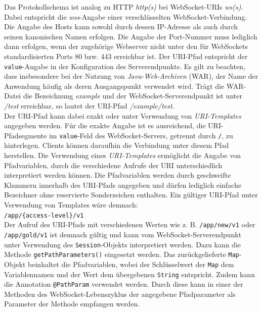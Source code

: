 \documentclass[11pt,a4paper,titlepage]{scrartcl}
\numberwithin{equation}{section}
\begin{document}
\noindent Das Protokollschema ist analog zu HTTP \textit{http(s)} bei WebSocket-URIs \textit{ws(s)}. Dabei entspricht die \textit{wss}-Angabe einer verschlüsselten WebSocket-Verbindung. Die Angabe des Hosts kann sowohl durch dessen IP-Adresse als auch durch seinen kanonischen Namen erfolgen. Die Angabe der Port-Nummer muss lediglich dann erfolgen, wenn der zugehörige Webserver nicht unter den für WebSockets standardisierten Ports 80 bzw. 443 erreichbar ist. Der URI-Pfad entspricht der \texttt{value}-Angabe in der Konfiguration des Serverendpunkts. Es gilt zu beachten, dass insbesondere bei der Nutzung von \textit{Java-Web-Archiven} (WAR), der Name der Anwendung häufig als deren Ausgangspunkt verwendet wird. Trägt die WAR-Datei die Bezeichnung \textit{example} und der WebSocket-Serverendpunkt ist unter \textit{/test} erreichbar, so lautet der URI-Pfad \textit{/example/test}. \\
\noindent Der URI-Pfad kann dabei exakt oder unter Verwendung von \textit{URI-Templates} angegeben werden. Für die exakte Angabe ist es ausreichend, die URI-Pfadsegmente im \texttt{value}-Feld des WebSocket-Servers, getrennt durch \texttt{/}, zu hinterlegen. Clients können daraufhin die Verbindung unter diesem Pfad herstellen. Die Verwendung eines \textit{URI-Templates} ermöglicht die Angabe von Pfadvariablen, durch die verschiedene Aufrufe der URI unterschiedlich interpretiert werden können. Die Pfadvariablen werden durch geschweifte Klammern innerhalb des URI-Pfads angegeben und dürfen lediglich einfache Bezeichner ohne reservierte Sonderzeichen enthalten. Ein gültiger URI-Pfad unter Verwendung von Templates wäre demnach: \\

\noindent\texttt{/app/\{access-level\}/v1}\\

\noindent Der Aufruf des URI-Pfads mit verschiedenen Werten wie z. B. \texttt{/app/new/v1} oder \texttt{/app/gold/v1} ist demnach gültig und kann vom WebSocket-Serverendpunkt unter Verwendung des \texttt{Session}-Objekts interpretiert werden. Dazu kann die Methode \texttt{getPathParameters()} eingesetzt werden. Das zurückgelieferte \texttt{Map}-Objekt beinhaltet die Pfadvariablen, wobei der Schlüsselwert der \texttt{Map} dem Variablennamen und der Wert dem übergebenen \texttt{String} entspricht. Zudem kann die Annotation \texttt{@PathParam} verwendet werden. Durch diese kann in einer der Methoden des WebSocket-Lebenszyklus der angegebene Pfadparameter als Parameter der Methode empfangen werden.\medskip
\end{document}
